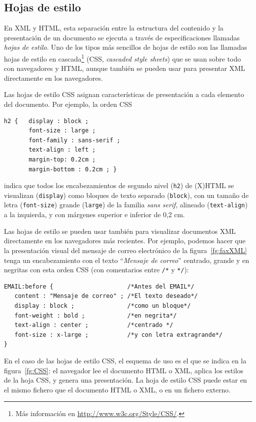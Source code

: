 \subsection{Hojas de estilo} En XML y HTML, esta separación entre la estructura del contenido y la presentación de un documento se ejecuta a través de especificaciones llamadas \emph{hojas de estilo}. Uno de los tipos más sencillos de hojas de estilo son las llamadas hojas de estilo en cascada\footnote{Más información en \url{http://www.w3c.org/Style/CSS/}.} (CSS, \emph{cascaded style sheets}) que se usan sobre todo con navegadores y HTML, aunque también se pueden usar para presentar XML directamente en los navegadores. 

Las hojas de estilo CSS asignan características de presentación a cada
elemento del documento. Por ejemplo, la orden CSS 
\begin{verbatim}
h2 {   display : block ;
       font-size : large ;
       font-family : sans-serif ;
       text-align : left ;
       margin-top: 0.2cm ;
       margin-bottom : 0.2cm ; }
\end{verbatim}
indica que todos los encabezamientos de segundo nivel (\texttt{h2}) de (X)HTML se visualizan (\texttt{display}) como bloques de texto separado (\texttt{block}), con un tamaño de letra (\texttt{font-size}) grande (\texttt{large}) de la familia \emph{sans serif}, alineado (\texttt{text-align}) a la izquierda, y con márgenes superior e inferior de 0,2 cm. 

Las hojas de estilo se pueden usar también para visualizar documentos
XML directamente en los navegadores más recientes. Por ejemplo,
podemos hacer que la presentación visual del mensaje de correo
electrónico de la figura~\ref{fg:faxXML} tenga un encabezamiento con
el texto ``\emph{Mensaje de correo}'' centrado, grande y en negritas
con esta orden CSS (con comentarios entre \texttt{/*} y  \texttt{*/}): 
\begin{verbatim}
EMAIL:before {                     /*Antes del EMAIL*/
   content : "Mensaje de correo" ; /*El texto deseado*/
   display : block ;               /*como un bloque*/
   font-weight : bold ;            /*en negrita*/
   text-align : center ;           /*centrado */
   font-size : x-large ;           /*y con letra extragrande*/
}
\end{verbatim}

En el caso de las hojas de estilo CSS, el esquema de uso es el que se indica en la figura~\ref{fg:CSS}: el navegador lee el documento HTML o XML,  aplica los estilos de la hoja CSS, y genera una presentación. La hoja de estilo CSS puede estar en el mismo fichero que el documento HTML o XML, o en un fichero externo. 

